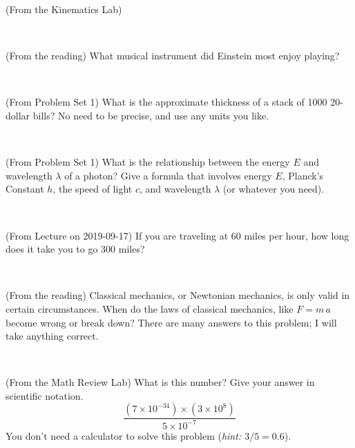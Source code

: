 \documentclass[12pt, letterpaper]{article}
\begin{document}
\begin{problem} (From the Kinematics Lab)

\end{problem}


\vfill ~

\begin{problem} (From the reading)
What musical instrument did Einstein most enjoy playing?
\end{problem}


\vfill ~

\begin{problem} (From Problem Set 1)
What is the approximate thickness of a stack of 1000 20-dollar bills?
No need to be precise, and use any units you like.
\end{problem}


\vfill ~

\begin{problem} (From Problem Set 1)
What is the relationship between the energy $E$ and wavelength
$\lambda$ of a photon? Give a formula that involves energy $E$,
Planck's Constant $h$, the speed of light $c$, and wavelength
$\lambda$ (or whatever you need).
\end{problem}

\vfill ~


\clearpage


\begin{problem} (From Lecture on 2019-09-17)
If you are traveling at 60 miles per hour, how long does
it take you to go 300 miles?
\end{problem}


\vfill ~

\begin{problem} (From the reading)
Classical mechanics, or Newtonian mechanics, is only valid in certain
circumstances. When do the laws of classical mechanics, like $F =
m\,a$ become wrong or break down? There are many answers to this
problem; I will take anything correct.
\end{problem}


\vfill ~

\begin{problem} (From the Math Review Lab)
What is this number? Give your answer in scientific notation.
$$
\frac{(7\times10^{-34})\times(3\times10^8)}{5\times10^{-7}}
$$
You don't need a calculator to solve this problem (\textit{hint: $3/5=0.6$}).
\end{problem}


\vfill ~
\end{document}
